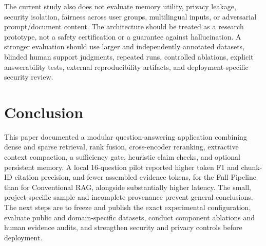 \documentclass[conference]{IEEEtran}
\begin{document}
The current study also does not evaluate memory utility, privacy leakage,
security isolation, fairness across user groups, multilingual inputs, or
adversarial prompt/document content. The architecture should be treated as a
research prototype, not a safety certification or a guarantee against
hallucination. A stronger evaluation should use larger and independently
annotated datasets, blinded human support judgments, repeated runs, controlled
ablations, explicit answerability tests, external reproducibility artifacts,
and deployment-specific security review.

\section{Conclusion}
This paper documented a modular question-answering application combining
dense and sparse retrieval, rank fusion, cross-encoder reranking, extractive
context compaction, a sufficiency gate, heuristic claim checks, and optional
persistent memory. A local 16-question pilot reported higher token F1 and
chunk-ID citation precision, and fewer assembled evidence tokens, for the
Full Pipeline than for Conventional RAG, alongside substantially higher
latency. The small, project-specific sample and incomplete provenance prevent
general conclusions. The next steps are to freeze and publish the exact
experimental configuration, evaluate public and domain-specific datasets,
conduct component ablations and human evidence audits, and strengthen
security and privacy controls before deployment.
\end{document}
